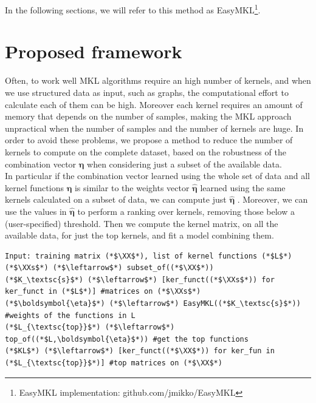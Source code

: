 \documentclass{esannV2}
\newcommand{\yy}{{\bf y}}
\newcommand{\KK}{{\bf K}}
\newcommand{\YY}{{\bf Y}}
\newcommand{\XX}{{\bf X}}
\newcommand{\XXs}{{\XX_\textsc{s}}}
\newcommand{\1}{{\bf 1}}
\begin{document}
In the following sections, we will refer to this method as EasyMKL\footnote{EasyMKL implementation: github.com/jmikko/EasyMKL}.


\section{Proposed framework}
Often, to work well MKL algorithms require an high number of kernels, and when we use structured data as input, such as graphs, the computational effort to calculate each of them can be high. Moreover each kernel requires an amount of memory that depends on the number of samples, making the MKL approach unpractical when the number of samples and the number of kernels are huge.
In order to avoid these problems, we propose a method to reduce the number of kernels to compute on the complete dataset, based on the robustness of the combination vector $\boldsymbol{\eta}$ when considering just a subset of the available data.\\
In particular if the combination vector learned using the whole set of data and all kernel functions $\boldsymbol{\eta}$ is similar to the weights vector $\hat{\boldsymbol{\eta}}$ learned using the same kernels calculated on a subset of data, we can compute just $\hat{\boldsymbol{\eta}}$ .
Moreover, we can use the values in $\hat{\boldsymbol{\eta}}$ to perform a ranking over kernels, removing those below a (user-specified) threshold.
Then we compute the kernel matrix, on all the available data, for just the top kernels, and fit a model combining them.



\begin{lstlisting}
Input: training matrix (*$\XX$*), list of kernel functions (*$L$*)
(*$\XXs$*) (*$\leftarrow$*) subset_of((*$\XX$*))
(*$K_\textsc{s}$*) (*$\leftarrow$*) [ker_funct((*$\XXs$*)) for ker_funct in (*$L$*)] #matrices on (*$\XXs$*)
(*$\boldsymbol{\eta}$*) (*$\leftarrow$*) EasyMKL((*$K_\textsc{s}$*)) #weights of the functions in L
(*$L_{\textsc{top}}$*) (*$\leftarrow$*) top_of((*$L,\boldsymbol{\eta}$*)) #get the top functions
(*$KL$*) (*$\leftarrow$*) [ker_funct((*$\XX$*)) for ker_fun in (*$L_{\textsc{top}}$*)] #top matrices on (*$\XX$*)
\end{lstlisting}
\end{document}
